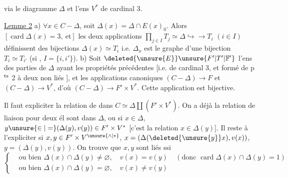 via le diagramme $\Delta$ et l'ens $V^*$ de cardinal 3.

\uline{Lemme 2} \quad a) $\forall x\in C-\Delta$, soit $\Delta(x)=\Delta\cap E(x)_0$. Alors $[\operatorname{card}\Delta(x)=3,\ \text{et}]$ les deux applications $\prod_{j\in I}T_j\simeq\Delta\hookrightarrow\!\longrightarrow T_i$ $(i\in I)$ définissent des bijections $\Delta(x)\simeq T_i$ i.e. $\Delta_x$ est le graphe d'une bijection $T_i\simeq T_{i'}$ (si , $I=\{i,i'\}$).
b) Soit  $\deleted{\unsure{E}}\unsure{F'|T'|\mathbb F'}$ l'ens des parties  de $\Delta$  ayant les propriétés précédentes [i.e. de cardinal 3, et formé de p$^{\rm ts}$ 2 à deux non liés ], et  les applications canoniques $(C-\Delta)\longrightarrow F$ et $(C-\Delta)\longrightarrow V^*$, d'où $(C-\Delta)\longrightarrow F'\times V^*$. Cette application est bijective.

Il faut expliciter la relation de   dans $C\simeq\Delta\amalg(F'\times V^*)$. On a déjà la relation de liaison pour deux él   sont dans $\Delta$, ou si $x\in\Delta$, $y\unsure{\in|=}(\Delta(y),v(y))\in F'\times V^*$ [c'est la relation $x\in\Delta(y)$]. Il reste à l'expliciter si $x,y\in F'\times V^{\unsure{\wedge|*}}$, $x=(\Delta(\deleted{\unsure{y}}x),v(x))$, $y=(\Delta(y),v(y))$. On trouve que $x,y$  sont liés ssi
\[
\left\{\begin{aligned}
&\text{ou bien }\Delta(x)\cap\Delta(y)\ne\varnothing,\quad v(x)=v(y)
&&(\text{donc }\operatorname{card}\Delta(x)\cap\Delta(y)=1)\\
&\text{ou bien }\Delta(x)\cap\Delta(y)=\varnothing,\quad v(x)\ne v(y)
\end{aligned}\right.
\]
